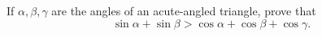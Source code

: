 If $\alpha,\beta,\gamma$ are the angles of an acute-angled triangle, prove that\[\sin \alpha + \sin \beta > \cos \alpha + \cos\beta  + \cos\gamma.\]